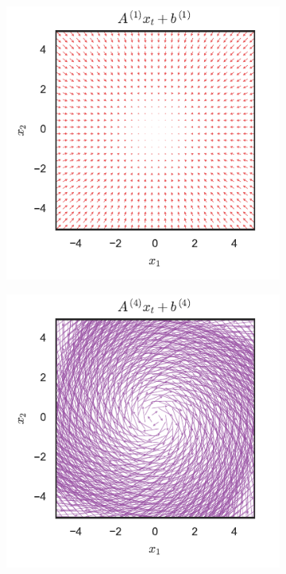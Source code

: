 \documentclass{article}
\begin{document}
\begin{figure}[t]
\centering%
\begin{subfigure}{.49\textwidth}
\includegraphics[width=\textwidth]{dynamics_1}
\end{subfigure} 
\begin{subfigure}{.49\textwidth}
\includegraphics[width=\textwidth]{dynamics_4}

\end{subfigure}
\end{figure}
\end{document}
